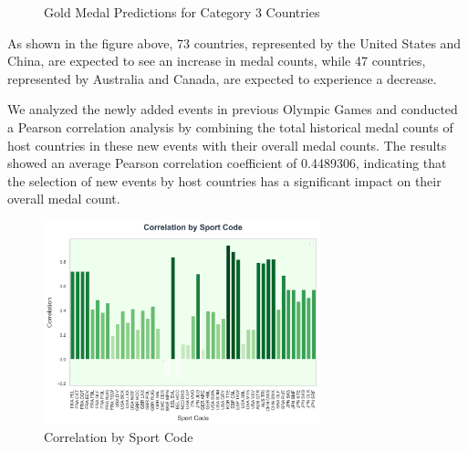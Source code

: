 \documentclass{mcmthesis}
\begin{document}
\begin{figure}[H]
	\centering
	\caption{Gold Medal Predictions for Category 3 Countries}
	\label{fig_E1}
\end{figure}

As shown in the figure above, 73 countries, represented by the United States and China, are expected to see an increase in medal counts, while 47 countries, represented by Australia and Canada, are expected to experience a decrease.

We analyzed the newly added events in previous Olympic Games and conducted a Pearson correlation analysis by combining the total historical medal counts of host countries in these new events with their overall medal counts. The results showed an average Pearson correlation coefficient of 0.4489306, indicating that the selection of new events by host countries has a significant impact on their overall medal count.

\begin{figure}[H]
    \centering
    \includegraphics[width=8cm]{graph/Correlation by Sport Code.png}
    \caption{Correlation by Sport Code} \label{Figure 4}
\end{figure}
\end{document}
